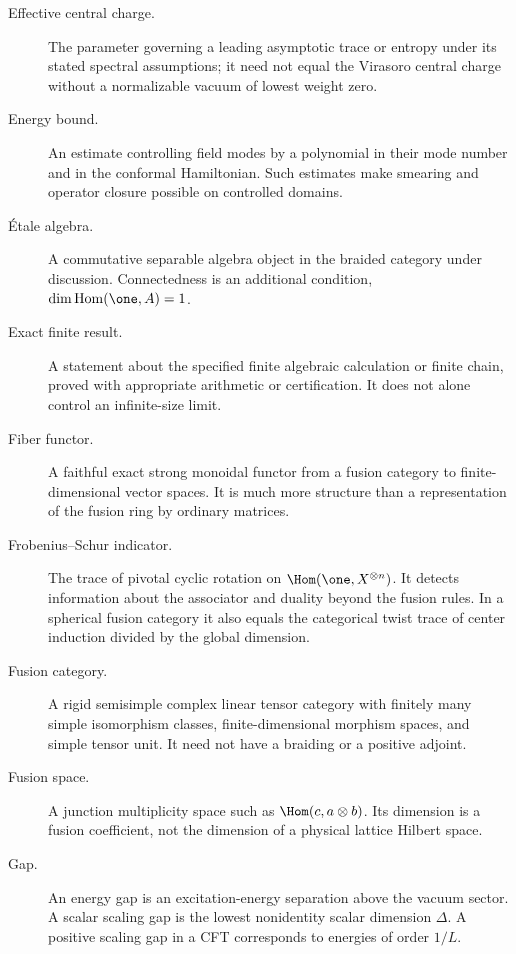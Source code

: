 \begin{description}
\item[Effective central charge.]The parameter governing a leading
asymptotic trace or entropy under its stated spectral assumptions;
it need not equal the Virasoro central charge without a
normalizable vacuum of lowest weight zero.

\item[Energy bound.]An estimate controlling field modes by a
polynomial in their mode number and in the conformal Hamiltonian.
Such estimates make smearing and operator closure possible on
controlled domains.

\item[\'Etale algebra.]A commutative separable algebra object
in the braided category under discussion. Connectedness is
an additional condition, $\dim\operatorname{Hom}(\one,A)=1$.

\item[Exact finite result.]A statement about the specified finite
algebraic calculation or finite chain, proved with appropriate
arithmetic or certification. It does not alone control an
infinite-size limit.

\item[Fiber functor.]A faithful exact strong monoidal functor
from a fusion category to finite-dimensional vector spaces.
It is much more structure than a representation of the fusion
ring by ordinary matrices.

\item[Frobenius--Schur indicator.]The trace of pivotal cyclic
rotation on $\Hom(\one,X^{\otimes n})$. It detects information
about the associator and duality beyond the fusion rules. In a
spherical fusion category it also equals the categorical twist
trace of center induction divided by the global dimension.

\item[Fusion category.]A rigid semisimple complex linear tensor
category with finitely many simple isomorphism classes,
finite-dimensional morphism spaces, and simple tensor unit.
It need not have a braiding or a positive adjoint.

\item[Fusion space.]A junction multiplicity space such as
$\Hom(c,a\otimes b)$. Its dimension is a fusion coefficient,
not the dimension of a physical lattice Hilbert space.

\item[Gap.]An energy gap is an excitation-energy separation above
the vacuum sector. A scalar scaling gap is the lowest nonidentity
scalar dimension $\Delta$. A positive scaling gap in a CFT
corresponds to energies of order $1/L$.


\end{description}
